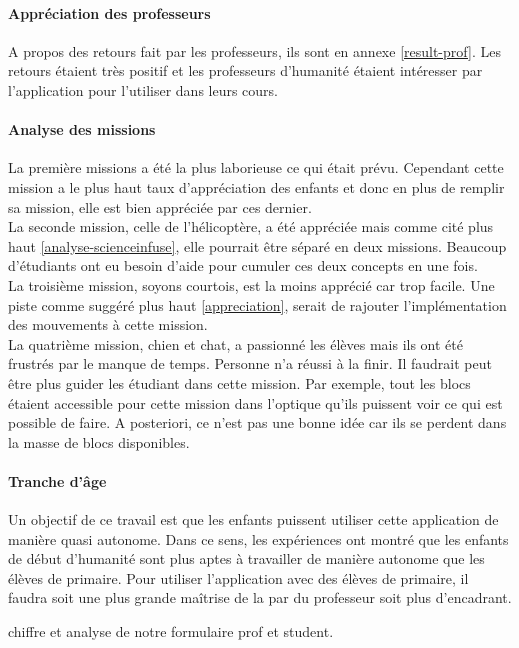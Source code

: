 \paragraph{Appréciation des professeurs}
A propos des retours fait par les professeurs, ils sont en annexe \ref{result-prof}. Les retours étaient très positif et les professeurs d'humanité étaient intéresser par l'application pour l'utiliser dans leurs cours.

\paragraph{Analyse des missions}
La première missions a été la plus laborieuse ce qui était prévu. Cependant cette mission a le plus haut taux d'appréciation des enfants et donc en plus de remplir sa mission, elle est bien appréciée par ces dernier.\\

La seconde mission, celle de l'hélicoptère, a été appréciée mais comme cité plus haut \ref{analyse-scienceinfuse}, elle pourrait être séparé en deux missions. Beaucoup d'étudiants ont eu besoin d'aide pour cumuler ces deux concepts en une fois.\\

La troisième mission, soyons courtois, est la moins apprécié car trop facile. Une piste comme suggéré plus haut \ref{appreciation}, serait de rajouter l'implémentation des mouvements à cette mission.\\

La quatrième mission, chien et chat, a passionné les élèves mais ils ont été frustrés par le manque de temps. Personne n'a réussi à la finir. Il faudrait peut être plus guider les étudiant dans cette mission. Par exemple, tout les blocs étaient accessible pour cette mission dans l'optique qu'ils puissent voir ce qui est possible de faire. A posteriori, ce n'est pas une bonne idée car ils se perdent dans la masse de blocs disponibles.

\paragraph{Tranche d'âge}
Un objectif de ce travail est que les enfants puissent utiliser cette application de manière quasi autonome. Dans ce sens, les expériences ont montré que les enfants de début d'humanité sont plus aptes à travailler de manière autonome que les élèves de primaire.
Pour utiliser l'application avec des élèves de primaire, il faudra soit une plus grande maîtrise de la par du professeur soit plus d'encadrant.






chiffre et analyse de notre formulaire prof et student.














